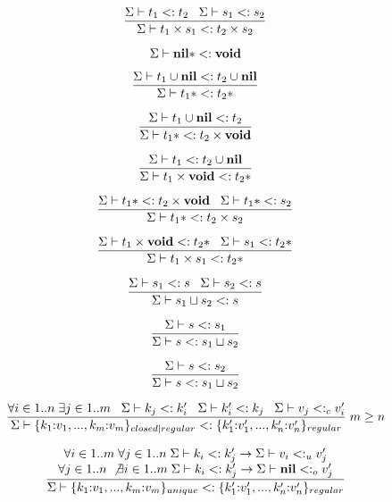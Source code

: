 \[
\dfrac{\Sigma \vdash t_{1} <: t_{2} \;\;\;
       \Sigma \vdash s_{1} <: s_{2}}
      {\Sigma \vdash t_{1} \times s_{1} <: t_{2} \times s_{2}}
\]

\[
\Sigma \vdash \mathbf{nil}{*} <: \mathbf{void}
\]

\[
\dfrac{\Sigma \vdash t_{1} \cup \mathbf{nil} <: t_{2} \cup \mathbf{nil}}
      {\Sigma \vdash t_{1}{*} <: t_{2}{*}}
\]

\[
\dfrac{\Sigma \vdash t_{1} \cup \mathbf{nil} <: t_{2}}
      {\Sigma \vdash t_{1}{*} <: t_{2} \times \mathbf{void}}
\]

\[
\dfrac{\Sigma \vdash t_{1} <: t_{2} \cup \mathbf{nil}}
      {\Sigma \vdash t_{1} \times \mathbf{void} <: t_{2}{*}}
\]

\[
\dfrac{\Sigma \vdash t_{1}{*} <: t_{2} \times \mathbf{void} \;\;\;
       \Sigma \vdash t_{1}{*} <: s_{2}}
      {\Sigma \vdash t_{1}{*} <: t_{2} \times s_{2}}
\]

\[
\dfrac{\Sigma \vdash t_{1} \times \mathbf{void} <: t_{2}{*} \;\;\;
       \Sigma \vdash s_{1} <: t_{2}{*}}
      {\Sigma \vdash t_{1} \times s_{1} <: t_{2}{*}}
\]

\[
\dfrac{\Sigma \vdash s_{1} <: s \;\;\;
       \Sigma \vdash s_{2} <: s}
      {\Sigma \vdash s_{1} \sqcup s_{2} <: s}
\]

\[
\dfrac{\Sigma \vdash s <: s_{1}}
      {\Sigma \vdash s <: s_{1} \sqcup s_{2}}
\]

\[
\dfrac{\Sigma \vdash s <: s_{2}}
      {\Sigma \vdash s <: s_{1} \sqcup s_{2}}
\]

\[
\dfrac{\forall i \in 1..n \; \exists j \in 1..m \;\;\;
       \Sigma \vdash k_{j} <: k_{i}' \;\;\;
       \Sigma \vdash k_{i}' <: k_{j} \;\;\;
       \Sigma \vdash v_{j} <:_{c} v_{i}'}
      {\Sigma \vdash \{k_{1}{:}v_{1}, ..., k_{m}{:}v_{m}\}_{closed|regular} <: \{k_{1}'{:}v_{1}', ..., k_{n}'{:}v_{n}'\}_{regular}} \; m \ge n
\]

\[
\dfrac{\begin{array}{c}
       \forall i \in 1..m \; \forall j \in 1..n \;
       \Sigma \vdash k_{i} <: k_{j}' \to \Sigma \vdash v_{i} <:_{u} v_{j}' \\
       \forall j \in 1..n \; \not\exists i \in 1..m \;
       \Sigma \vdash k_{i} <: k_{j}' \to \Sigma \vdash \mathbf{nil} <:_{o} v_{j}'
       \end{array}}
      {\Sigma \vdash \{k_{1}{:}v_{1}, ..., k_{m}{:}v_{m}\}_{unique} <:
                    \{k_{1}'{:}v_{1}', ..., k_{n}'{:}v_{n}'\}_{regular}}
\]

